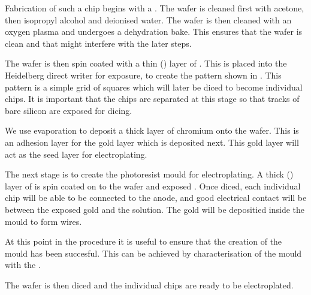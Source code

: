 Fabrication of such a chip begins with a . The wafer
is cleaned first with acetone, then isopropyl alcohol and deionised water. The
wafer is then cleaned with an oxygen plasma and undergoes a dehydration bake.
This ensures that the wafer is clean and  that
might interfere with the later steps.

The wafer is then spin coated with a thin () layer of . This is placed into the Heidelberg direct writer for exposure, to
create the pattern shown in . This pattern is a simple grid of
 squares which will later be diced to become individual chips.
It is important that the chips are separated at this stage so that tracks of
bare silicon are exposed for dicing.

We use evaporation to deposit a  thick layer of chromium onto the
wafer. This is an adhesion layer for the  gold layer which is
deposited next. This gold layer will act as the seed layer for electroplating.

The next stage is to create the photoresist mould for electroplating. A thick
() layer of  is spin coated on to the
wafer and exposed . Once diced, each
individual chip will be able to be connected to the anode, and good electrical
contact will be  between the exposed gold and the solution. The gold
will be depositied inside the mould to form wires.

At this point in the procedure it is useful to ensure that the creation of
the mould has been succesful. This can be achieved by characterisation of the
mould with the . 

The wafer is then diced and the individual chips are ready to be electroplated.


